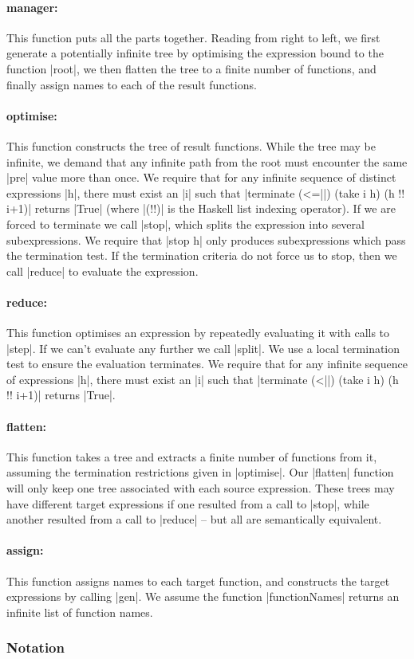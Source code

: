 \documentclass[draft]{sigplanconf}
\begin{document}
\newcommand{\function}[1]{\paragraph{\textsf{#1:}}\hspace{-3mm}}

\function{manager} This function puts all the parts together. Reading from right to left, we first generate a potentially infinite tree by optimising the expression bound to the function |root|, we then flatten the tree to a finite number of functions, and finally assign names to each of the result functions.

\function{optimise} This function constructs the tree of result functions. While the tree may be infinite, we demand that any infinite path from the root must encounter the same |pre| value more than once. We require that for any infinite sequence of distinct expressions |h|, there must exist an |i| such that |terminate (<=||) (take i h) (h !! i+1)| returns |True| (where |(!!)| is the Haskell list indexing operator). If we are forced to terminate we call |stop|, which splits the expression into several subexpressions. We require that |stop h| only produces subexpressions which pass the termination test. If the termination criteria do not force us to stop, then we call |reduce| to evaluate the expression.

\function{reduce} This function optimises an expression by repeatedly evaluating it with calls to |step|. If we can't evaluate any further we call |split|. We use a local termination test to ensure the evaluation terminates. We require that for any infinite sequence of expressions |h|, there must exist an |i| such that |terminate (<||) (take i h) (h !! i+1)| returns |True|.

\function{flatten} This function takes a tree and extracts a finite number of functions from it, assuming the termination restrictions given in |optimise|. Our |flatten| function will only keep one tree associated with each source expression. These trees may have different target expressions if one resulted from a call to |stop|, while another resulted from a call to |reduce| -- but all are semantically equivalent.

\function{assign} This function assigns names to each target function, and constructs the target expressions by calling |gen|. We assume the function |functionNames| returns an infinite list of function names.

\subsubsection{Notation}
\label{sec:child_notation}
\end{document}
